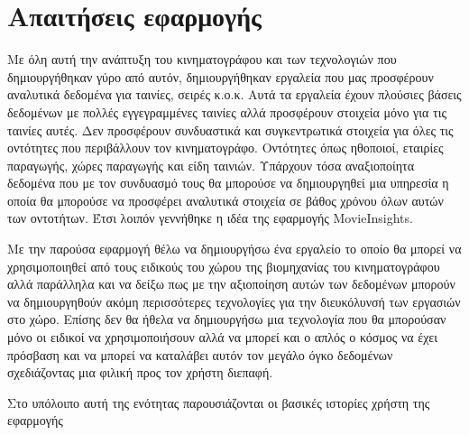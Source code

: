 \chapter{Απαιτήσεις εφαρμογής}
Με όλη αυτή την ανάπτυξη του κινηματογράφου και των τεχνολογιών που δημιουργήθηκαν γύρο από αυτόν, δημιουργήθηκαν εργαλεία που μας προσφέρουν αναλυτικά δεδομένα για ταινίες, σειρές κ.ο.κ. Αυτά τα εργαλεία έχουν πλούσιες βάσεις δεδομένων με πολλές εγγεγραμμένες ταινίες αλλά προσφέρουν στοιχεία μόνο για τις ταινίες αυτές. Δεν προσφέρουν συνδυαστικά και συγκεντρωτικά στοιχεία για όλες τις οντότητες που περιβάλλουν τον κινηματογράφο. Οντότητες όπως ηθοποιοί, εταιρίες παραγωγής, χώρες παραγωγής και είδη ταινιών. Υπάρχουν τόσα αναξιοποίητα δεδομένα που με τον συνδυασμό τους θα μπορούσε να δημιουργηθεί μια υπηρεσία η οποία θα μπορούσε να προσφέρει αναλυτικά στοιχεία σε βάθος χρόνου όλων αυτών των οντοτήτων. Έτσι λοιπόν γεννήθηκε η ιδέα της εφαρμογής MovieInsights. 

Με την παρούσα εφαρμογή θέλω να δημιουργήσω ένα εργαλείο το οποίο θα μπορεί να χρησιμοποιηθεί από τους ειδικούς του χώρου της βιομηχανίας του κινηματογράφου αλλά παράλληλα και να δείξω πως με την αξιοποίηση αυτών των δεδομένων μπορούν να δημιουργηθούν ακόμη περισσότερες τεχνολογίες για την διευκόλυνσή των εργασιών στο χώρο. Επίσης δεν θα ήθελα να δημιουργήσω μια τεχνολογία που θα μπορούσαν μόνο οι ειδικοί να χρησιμοποιήσουν αλλά να μπορεί και ο απλός ο κόσμος να έχει πρόσβαση και να μπορεί να καταλάβει αυτόν τον μεγάλο όγκο δεδομένων σχεδιάζοντας μια φιλική προς τον χρήστη διεπαφή.

Στο υπόλοιπο αυτή της ενότητας παρουσιάζονται οι βασικές ιστορίες χρήστη της εφαρμογής





